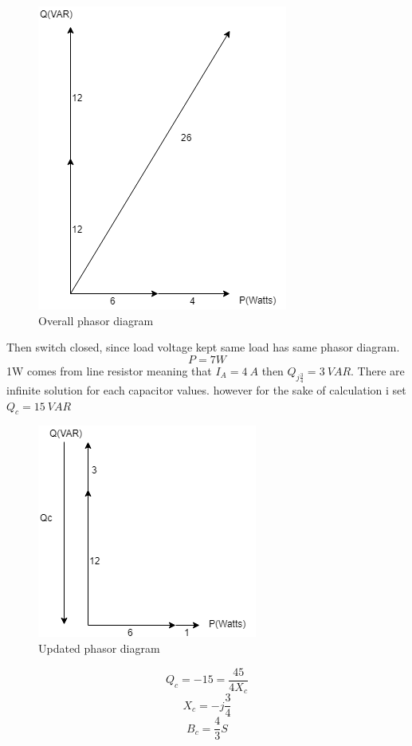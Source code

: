 \documentclass[11pt]{article}
\begin{document}
\begin{figure}[H]
  \includegraphics[scale=0.6, center]{overallphasor}
  \caption{Overall phasor diagram}
  \label{fig:zero}
\end{figure}
Then switch closed, since load voltage kept same load has same phasor diagram.
\[P=7W\]
1W comes from line resistor meaning that $I_A=4\>A$ then $Q_{j\frac{3}{4}}=3\> VAR$. There are infinite solution for each capacitor values. however for the sake of calculation i set $Q_c=15\>VAR$
\begin{figure}[H]
  \includegraphics[scale=0.6, center]{new-phasor}
  \caption{Updated phasor diagram}
  \label{fig:zero}
\end{figure}
\[Q_c=-15=\frac{45}{4X_c}\]
\[X_c=-j\frac{3}{4}\]
\[B_c=\frac{4}{3}S\]
\end{document}
